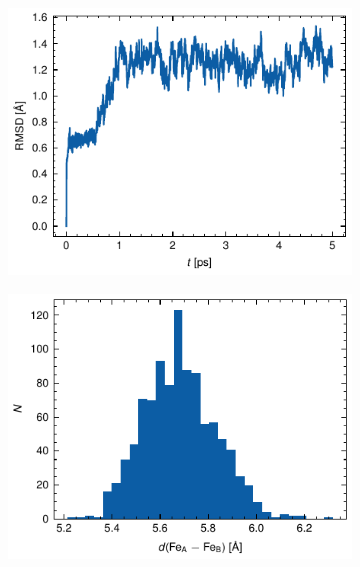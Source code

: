\begin{figure}[htbp]
    \centering
    \begin{subfigure}{.49\textwidth}
        \centering
        \includegraphics[width=\textwidth]{Figures/TIP3P_rmsd.pdf}
    \end{subfigure}
    \begin{subfigure}{.49\textwidth}
        \centering
        \includegraphics[width=\textwidth]{Figures/TIP3P_fe-fe_hist.pdf}
    \end{subfigure}
    \par\bigskip
    \begin{subfigure}{.49\textwidth}
        \centering

\end{subfigure}
\end{figure}

